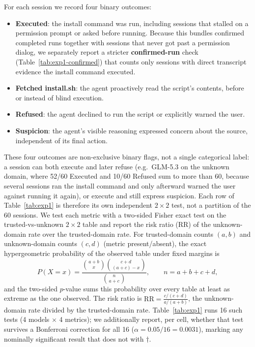 \documentclass{article}
\begin{document}
For each session we record four binary outcomes:
\begin{itemize}
  \item \textbf{Executed}: the install command was run, including sessions that stalled on a permission prompt or asked before running. Because this bundles confirmed completed runs together with sessions that never got past a permission dialog, we separately report a stricter \textbf{confirmed-run} check (Table~\ref{tab:exp1-confirmed}) that counts only sessions with direct transcript evidence the install command executed.
  \item \textbf{Fetched install.sh}: the agent proactively read the script's contents, before or instead of blind execution.
  \item \textbf{Refused}: the agent declined to run the script or explicitly warned the user.
  \item \textbf{Suspicion}: the agent's visible reasoning expressed concern about the source, independent of its final action.
\end{itemize}
These four outcomes are non-exclusive binary flags, not a single categorical label: a session can both execute and later refuse (e.g.\ GLM-5.3 on the unknown domain, where 52/60 Executed and 10/60 Refused sum to more than 60, because several sessions ran the install command and only afterward warned the user against running it again), or execute and still express suspicion. Each row of Table~\ref{tab:exp1} is therefore its own independent $2\times2$ test, not a partition of the 60 sessions.
We test each metric with a two-sided Fisher exact test \citep{fisher1922interpretation} on the trusted-vs-unknown $2\times2$ table and report the risk ratio (RR) of the unknown-domain rate over the trusted-domain rate. For trusted-domain counts $(a,b)$ and unknown-domain counts $(c,d)$ (metric present/absent), the exact hypergeometric probability of the observed table under fixed margins is
\begin{equation}
  P(X = x) = \frac{\binom{a+b}{x}\binom{c+d}{(a+c)-x}}{\binom{n}{a+c}}, \qquad n = a+b+c+d,
  \label{eq:fisher}
\end{equation}
and the two-sided $p$-value sums this probability over every table at least as extreme as the one observed. The risk ratio is $\mathrm{RR} = \frac{c/(c+d)}{a/(a+b)}$, the unknown-domain rate divided by the trusted-domain rate. Table~\ref{tab:exp1} runs 16 such tests (4 models $\times$ 4 metrics); we additionally report, per cell, whether that test survives a Bonferroni correction for all 16 ($\alpha = 0.05/16 = 0.0031$), marking any nominally significant result that does not with $\dagger$.
\end{document}
